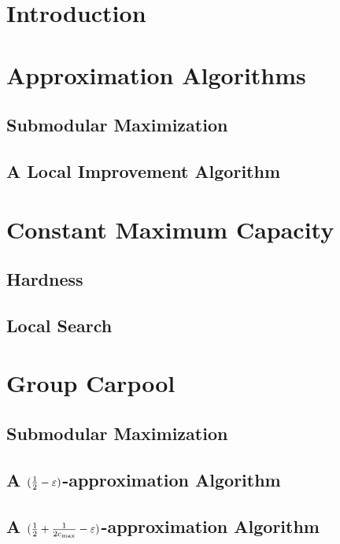 \begin{abstract}

\end{abstract}

\section{Introduction}


\section{Approximation Algorithms}
\label{sec:approx}


   \subsection{Submodular Maximization}
   \label{sec:sub}
   

   \subsection{A Local Improvement Algorithm}
   \label{sec:improve}
   

\section{Constant Maximum Capacity}
\label{sec:cmax}   


   \subsection{Hardness}
   \label{sec:hardness}
   

   \subsection{Local Search}
   \label{sec:local}
   

\section{Group Carpool}
\label{sec:group}


   \subsection{Submodular Maximization}
   
   
   \subsection{A \texorpdfstring{$(\frac{1}{2} - \varepsilon)$}--approximation
	Algorithm}
   
   
   \subsection{A \texorpdfstring{$(\frac{1}{2} + \frac{1}{2c_{\max}} - \varepsilon)$}--approximation
	Algorithm}
   
